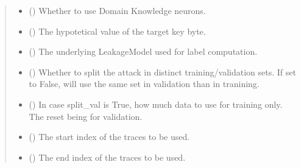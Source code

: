 \documentclass[letterpaper,10pt,english]{sphinxmanual}
\begin{document}
\begin{fulllineitems}
\begin{fulllineitems}
\begin{quote}
\begin{description}
\begin{itemize}
\item {} 
\sphinxAtStartPar
{} () \textendash{} Whether to use Domain Knowledge neurons.

\item {} 
\sphinxAtStartPar
{} () \textendash{} The hypotetical value of the target key byte.

\item {} 
\sphinxAtStartPar
{} ({\hyperref[\detokenize{MLSCAlib.Ciphers:MLSCAlib.Ciphers.leakage_model.LeakageModel}]{}}) \textendash{} The underlying LeakageModel used for label computation.

\item {} 
\sphinxAtStartPar
{} (\sphinxstyleliteralemphasis{\sphinxupquote{, }}) \textendash{} Whether to split the attack in distinct training/validation sets. If set to
False, will use the same set in validation than in tranining.

\item {} 
\sphinxAtStartPar
{} (\sphinxstyleliteralemphasis{\sphinxupquote{, }}) \textendash{} In case split\_val is True, how much data to use for training only. The reset
being for validation.

\item {} 
\sphinxAtStartPar
{} (\sphinxstyleliteralemphasis{\sphinxupquote{, }}) \textendash{} The start index of the traces to be used.

\item {} 
\sphinxAtStartPar
{} (\sphinxstyleliteralemphasis{\sphinxupquote{, }}) \textendash{} The end index of the traces to be used.

\end{itemize}


\end{description}
\end{quote}
\end{fulllineitems}
\end{fulllineitems}
\end{document}
